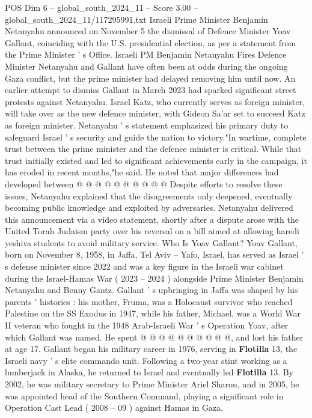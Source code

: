 \begin{textsample}{POS Dim 6 – global\_south\_2024\_11 – Score 3.00 – global\_south\_2024\_11/117295991.txt}  \label{ex:f6_pos_396}
Israeli Prime Minister Benjamin Netanyahu announced on November 5 the dismissal of Defence Minister Yoav Gallant, coinciding with the U.S. presidential election, as per a statement from the Prime Minister ' s Office.
Israeli PM Benjamin Netanyahu Fires Defence Minister Netanyahu and Gallant have often been at odds during the ongoing Gaza conflict, but the prime minister had delayed removing him until now.
An earlier attempt to dismiss Gallant in March 2023 had sparked significant street protests against Netanyahu.
Israel Katz, who currently serves as foreign minister, will take over as the new defence minister, with Gideon Sa'ar set to succeed Katz as foreign minister.
Netanyahu ' s statement emphasized his primary duty to safeguard Israel ' s security and guide the nation to victory."In wartime, complete trust between the prime minister and the defence minister is critical.
While that trust initially existed and led to significant achievements early in the campaign, it has eroded in recent months,"he said.
He noted that major differences had developed between @ @ @ @ @ @ @ @ @ @ Despite efforts to resolve these issues, Netanyahu explained that the disagreements only deepened, eventually becoming public knowledge and exploited by adversaries.
Netanyahu delivered this announcement via a video statement, shortly after a dispute arose with the United Torah Judaism party over his reversal on a bill aimed at allowing haredi yeshiva students to avoid military service.
Who Is Yoav Gallant?
Yoav Gallant, born on November 8, 1958, in Jaffa, Tel Aviv -- Yafo, Israel, has served as Israel ' s defense minister since 2022 and was a key figure in the Israeli war cabinet during the Israel-Hamas War ( 2023 -- 2024 ) alongside Prime Minister Benjamin Netanyahu and Benny Gantz.
Gallant ' s upbringing in Jaffa was shaped by his parents ' histories : his mother, Fruma, was a Holocaust survivor who reached Palestine on the SS Exodus in 1947, while his father, Michael, was a World War II veteran who fought in the 1948 Arab-Israeli War ' s Operation Yoav, after which Gallant was named.
He spent @ @ @ @ @ @ @ @ @ @, and lost his father at age 17.
Gallant began his military career in 1976, serving in \textbf{Flotilla} 13, the Israeli navy ' s elite commando unit.
Following a two-year stint working as a lumberjack in Alaska, he returned to Israel and eventually led \textbf{Flotilla} 13.
By 2002, he was military secretary to Prime Minister Ariel Sharon, and in 2005, he was appointed head of the Southern Command, playing a significant role in Operation Cast Lead ( 2008 -- 09 ) against Hamas in Gaza.

\end{textsample}
